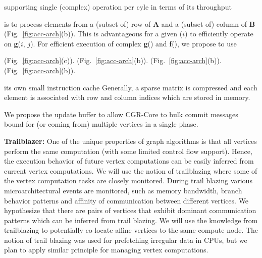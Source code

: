 supporting single (complex) operation per cyle in terms of its throughput  

is to process elements from a (subset of) row of \textbf{A} and a (subset of) column of \textbf{B} (Fig.~\ref{fig:acc-arch}(b)).
This is advantageous for a given ($i$) to efficiently operate on \textbf{g}($i$, $j$).
For efficient execution of complex \textbf{g}() and \textbf{f}(), we propose to use 

(Fig.~\ref{fig:acc-arch}(c)).
(Fig.~\ref{fig:acc-arch}(b)).
(Fig.~\ref{fig:acc-arch}(b)).
(Fig.~\ref{fig:acc-arch}(b)).


its own small instruction cache
Generally, a sparse matrix is compressed and each element is associated with row and column indices which are stored in memory.


\begin{comment}
\noindent
\textbf{Coarse-Grained Reconfigurable Processing Engine:} 
To efficiently execute graph primitives, we aim to architect the CGR-Core with a coarse-grain reconfigurable (CGR) array of execution units. 
This architecture based on a spatial data-flow architecture can significantly reduce the overhead of instruction fetches and data transfers within an accelerator, as many operations for a complex graph primitive function can be executed by a single (macro) instruction and a few registerfile and/or cache accesses. 
Furthermore, for streaming graph analytics, it is very inefficient to apply computations and changes to individual vertices as they arrive. 
\end{comment}

We propose the update buffer to allow CGR-Core to bulk commit messages bound for (or coming from) multiple vertices in a single phase.

\noindent
\textbf{Trailblazer:} 
One of the unique properties of graph algorithms is that all vertices perform the same computation (with some limited control flow support). 
Hence, the execution behavior of future vertex computations can be easily inferred from current vertex computations. 
We will use the notion of trailblazing where some of the vertex computation tasks are closely monitored. 
During trail blazing various microarchitectural events are monitored, such as memory bandwidth, branch behavior patterns and affinity of communication between different vertices. 
We hypothesize that there are pairs of vertices that exhibit dominant communication patterns which can be inferred from trail blazing. 
We will use the knowledge from trailblazing to potentially co-locate affine vertices to the same compute node. 
The notion of trail blazing was used for prefetching irregular data in CPUs, but we plan to apply similar principle for managing vertex computations.
